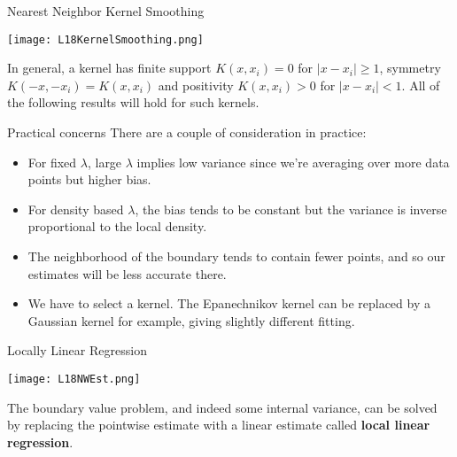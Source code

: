 \documentclass[10pt, table, dvipsnames,xcdraw,handout]{beamer}
\begin{document}
\begin{frame}[fragile]{Nearest Neighbor Kernel Smoothing}
  \begin{minipage}[t][0.5\textheight][t]{\textwidth}
	\centering \texttt{[image: L18KernelSmoothing.png]} 
  \end{minipage}
  \vfill
\begin{minipage}[t][0.5\textheight][t]{\textwidth}
In general, a kernel has finite support $K(x,x_i) = 0$ for $|x-x_i|\geq1$, symmetry $K(-x,-x_i) = K(x,x_i)$ and positivity $K(x,x_i)>0$ for $|x-x_i|<1$. All of the following results will hold for such kernels. 
\end{minipage}
\end{frame}



\begin{frame}[fragile]{Practical concerns}
There are a couple of consideration in practice:
\begin{itemize}
\item[] For fixed $\lambda$, large $\lambda$ implies low variance since we're averaging over more data points but higher bias. \pause
\item[] For density based $\lambda$, the bias tends to be constant but the variance is inverse proportional to the local density.\pause
\item[] The neighborhood of the boundary tends to contain fewer points, and so our estimates will be less accurate there. \pause
\item[] We have to select a kernel. The Epanechnikov kernel can be replaced by a Gaussian kernel for example, giving slightly different fitting. 
\end{itemize}

\end{frame}



\begin{frame}[fragile]{Locally Linear Regression}
  \begin{minipage}[t][0.5\textheight][t]{\textwidth}
	\centering \texttt{[image: L18NWEst.png]} 
  \end{minipage}
  \vfill
\begin{minipage}[t][0.5\textheight][t]{\textwidth}
The boundary value problem, and indeed some internal variance, can be solved by replacing the pointwise estimate with a linear estimate called \textbf{local linear regression}. 
\end{minipage}
\end{frame}
\end{document}
